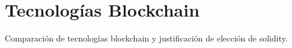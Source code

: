 \chapter{Tecnologías Blockchain}
\label{cp:blockchain-technologies}

\parindent0pt

Comparación de tecnologías blockchain y justificación de elección de solidity.
